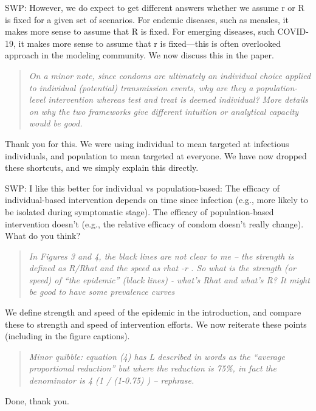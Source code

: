 SWP: However, we do expect to get different answers whether we assume r
or R is fixed for a given set of scenarios. For endemic diseases, such
as measles, it makes more sense to assume that R is fixed. For emerging
diseases, such COVID-19, it makes more sense to assume that r is
fixed---this is often overlooked approach in the modeling community. We
now discuss this in the paper.

\begin{quote}\sl
On a minor note, since condoms are ultimately an individual choice
applied to individual (potential) transmission events, why are they a
population-level intervention whereas test and treat is deemed
individual? More details on why the two frameworks give different
intuition or analytical capacity would be good.
\end{quote}

Thank you for this. We were using individual to mean targeted at
infectious individuals, and population to mean targeted at everyone. We
have now dropped these shortcuts, and we simply explain this directly.

SWP: I like this better for individual vs population-based: The efficacy
of individual-based intervention depends on time since infection (e.g.,
more likely to be isolated during symptomatic stage). The efficacy of
population-based intervention doesn't (e.g., the relative efficacy of
condom doesn't really change). What do you think?

\begin{quote}\sl
In Figures 3 and 4, the black lines are not clear to me -- the strength
is defined as R/Rhat and the speed as rhat -r . So what is the strength
(or speed) of ``the epidemic'' (black lines) - what's Rhat and what's R?
It might be good to have some prevalence curves
\end{quote}

We define strength and speed of the epidemic in the introduction, and
compare these to strength and speed of intervention efforts. We now
reiterate these points (including in the figure captions).

\begin{quote}\sl
Minor quibble: equation (4) has L described in words as the ``average
proportional reduction'' but where the reduction is 75\%, in fact the
denominator is 4 (1 / (1-0.75) ) -- rephrase.
\end{quote}

Done, thank you.
